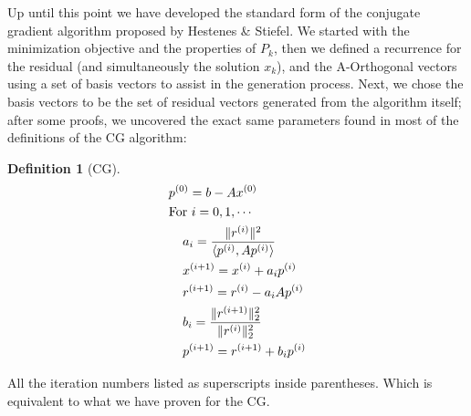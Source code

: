 \documentclass[]{article}
\theoremstyle{definition}
\newtheorem{definition}{Definition}      %
\begin{document}
            Up until this point we have developed the standard form of the conjugate gradient algorithm proposed by Hestenes \& Stiefel\cite{paper:cg_original}.   We started with the minimization objective and the properties of $P_k$, then we defined a recurrence for the residual (and simultaneously the solution $x_k$), and the A-Orthogonal vectors using a set of basis vectors to assist in the generation process. Next, we chose the basis vectors to be the set of residual vectors generated from the algorithm itself; after some proofs, we uncovered the exact same parameters found in most of the definitions of the CG algorithm:
            \begin{definition}[CG]\label{def:CG}
                \begin{align}
                    & p^{(0)} = b - Ax^{(0)} 
                    \\&
                    \text{For } i = 0,1, \cdots
                    \\&\hspace{1.1em}
                    \begin{aligned}
                        & a_{i} = \frac{\Vert r^{(i)}\Vert^2}{\langle p^{(i)}, Ap^{(i)}\rangle}
                        \\
                        & x^{(i + 1)} = x^{(i)} + a_i p^{(i)}
                        \\
                        & r^{(i + 1)} = r^{(i)} - a_iAp^{(i)}
                        \\
                        & b_{i} = \frac{\Vert r^{(i + 1)}\Vert_2^2}{\Vert r^{(i)}\Vert_2^2}
                        \\
                        & p^{(i + 1)} = r^{(i + 1)} + b_{i}p^{(i)}
                    \end{aligned}
                \end{align}
            \end{definition}
            All the iteration numbers listed as superscripts inside parentheses. Which is equivalent to what we have proven for the CG.
\end{document}
